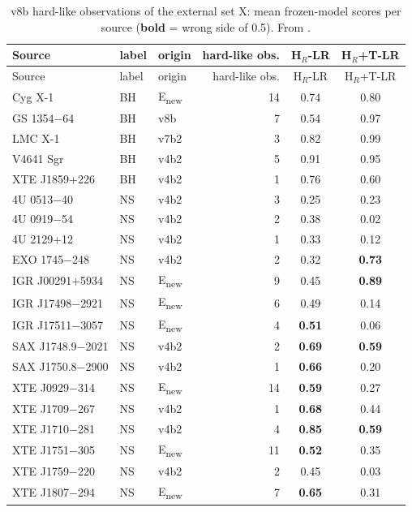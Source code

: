 {\footnotesize
\begin{longtable}{@{}lllrcc@{}}
\caption[External hard-like sources]{v8b hard-like observations of the external set X: mean frozen-model scores per source
(\textbf{bold} = wrong side of 0.5). From .}\label{tab:p4v8bsrc}\\
\toprule
Source & label & origin & hard-like obs. & H$_R$-LR & H$_R$+T-LR \\
\midrule\endfirsthead
\toprule Source & label & origin & hard-like obs. & H$_R$-LR & H$_R$+T-LR \\ \midrule\endhead
\bottomrule\endfoot
Cyg X-1 & BH & E\textsubscript{new} & 14 & 0.74 & 0.80 \\
GS 1354$-$64 & BH & v8b & 7 & 0.54 & 0.97 \\
LMC X-1 & BH & v7b2 & 3 & 0.82 & 0.99 \\
V4641 Sgr & BH & v4b2 & 5 & 0.91 & 0.95 \\
XTE J1859+226 & BH & v4b2 & 1 & 0.76 & 0.60 \\
4U 0513$-$40 & NS & v4b2 & 3 & 0.25 & 0.23 \\
4U 0919$-$54 & NS & v4b2 & 2 & 0.38 & 0.02 \\
4U 2129+12 & NS & v4b2 & 1 & 0.33 & 0.12 \\
EXO 1745$-$248 & NS & v4b2 & 2 & 0.32 & \textbf{0.73} \\
IGR J00291+5934 & NS & E\textsubscript{new} & 9 & 0.45 & \textbf{0.89} \\
IGR J17498$-$2921 & NS & E\textsubscript{new} & 6 & 0.49 & 0.14 \\
IGR J17511$-$3057 & NS & E\textsubscript{new} & 4 & \textbf{0.51} & 0.06 \\
SAX J1748.9$-$2021 & NS & v4b2 & 2 & \textbf{0.69} & \textbf{0.59} \\
SAX J1750.8$-$2900 & NS & v4b2 & 1 & \textbf{0.66} & 0.20 \\
XTE J0929$-$314 & NS & E\textsubscript{new} & 14 & \textbf{0.59} & 0.27 \\
XTE J1709$-$267 & NS & v4b2 & 1 & \textbf{0.68} & 0.44 \\
XTE J1710$-$281 & NS & v4b2 & 4 & \textbf{0.85} & \textbf{0.59} \\
XTE J1751$-$305 & NS & E\textsubscript{new} & 11 & \textbf{0.52} & 0.35 \\
XTE J1759$-$220 & NS & v4b2 & 2 & 0.45 & 0.03 \\
XTE J1807$-$294 & NS & E\textsubscript{new} & 7 & \textbf{0.65} & 0.31 \\
\end{longtable}}

